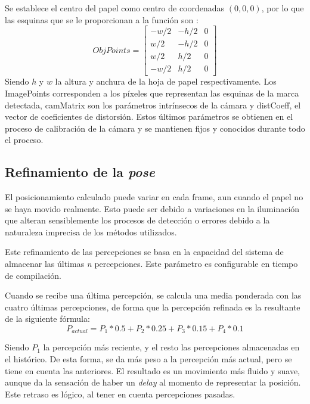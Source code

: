 Se establece el centro del papel como centro de coordenadas $(0,0,0)$, por lo que las esquinas que se le proporcionan a la función son :
\begin{equation}
ObjPoints =\begin{bmatrix} -w/2 & -h/2 & 0 \\
                            w/2 & -h/2 & 0 \\
                            w/2 &  h/2 & 0 \\
                           -w/2 &  h/2 & 0
\end{bmatrix}
\end{equation}
Siendo $h$ y $w$ la altura y anchura de la hoja de papel respectivamente. Los ImagePoints corresponden a los píxeles que
representan las esquinas de la marca detectada, camMatrix son los parámetros intrínsecos de la
cámara y distCoeff, el vector de coeficientes de distorsión. Estos últimos parámetros se obtienen en
el proceso de calibración de la cámara y se mantienen fijos y conocidos durante todo el proceso.

\subsection{Refinamiento de la \emph{pose}}
El posicionamiento calculado puede variar en cada frame, aun cuando el papel no se haya movido
realmente. Esto puede ser debido a variaciones en la iluminación que alteran sensiblemente los
procesos de detección o errores debido a la naturaleza imprecisa de los métodos utilizados.

Este refinamiento de las percepciones se basa en la capacidad del sistema de almacenar las últimas
\textit{n} percepciones. Este parámetro es configurable en tiempo de compilación.

Cuando se recibe una última percepción, se calcula una media ponderada con las cuatro últimas
percepciones, de forma que la percepción refinada es la resultante de la siguiente fórmula:
\begin{equation}
P_{actual} = P_1*0.5 + P_2*0.25 + P_3*0.15 + P_4*0.1
\end{equation}

Siendo $P_1$ la percepción más reciente, y el resto las percepciones almacenadas en el histórico. De esta forma, se da más peso a la percepción más actual, pero se tiene en cuenta las anteriores. El resultado es un movimiento más fluido y suave, aunque da la sensación de haber un \textit{delay} al momento de representar la posición. Este retraso es lógico, al tener en cuenta percepciones pasadas.

